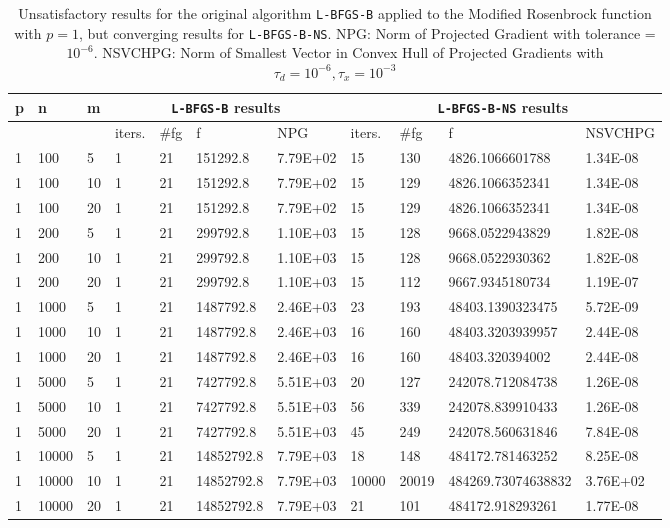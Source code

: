 \begin{table}
  \scriptsize
  \begin{center}
    \begin{tabular}{|l|l|l|l|l|l|l|l|l|l|l|}
      \hline
      p  &  n  &  m  & \multicolumn{4}{|c|}{\texttt{L-BFGS-B} results} & \multicolumn{4}{|c|}{\texttt{L-BFGS-B-NS} results} \\ \hline
      & &  & iters. & \#fg & f & NPG & iters. & \#fg & f & NSVCHPG \\ \hline
      1 & 100 & 5  & 1 & 21 & 151292.8 & 7.79E+02 & 15 & 130 & 4826.1066601788 & 1.34E-08\\
      1 & 100 & 10  & 1 & 21 & 151292.8 & 7.79E+02 & 15 & 129 & 4826.1066352341 & 1.34E-08\\
      1 & 100 & 20  & 1 & 21 & 151292.8 & 7.79E+02 & 15 & 129 & 4826.1066352341 & 1.34E-08\\
      1 & 200 & 5  & 1 & 21 & 299792.8 & 1.10E+03 & 15 & 128 & 9668.0522943829 & 1.82E-08\\
      1 & 200 & 10  & 1 & 21 & 299792.8 & 1.10E+03 & 15 & 128 & 9668.0522930362 & 1.82E-08\\
      1 & 200 & 20  & 1 & 21 & 299792.8 & 1.10E+03 & 15 & 112 & 9667.9345180734 & 1.19E-07\\
      1 & 1000 & 5  & 1 & 21 & 1487792.8 & 2.46E+03 & 23 & 193 & 48403.1390323475 & 5.72E-09\\
      1 & 1000 & 10  & 1 & 21 & 1487792.8 & 2.46E+03 & 16 & 160 & 48403.3203939957 & 2.44E-08\\
      1 & 1000 & 20  & 1 & 21 & 1487792.8 & 2.46E+03 & 16 & 160 & 48403.320394002 & 2.44E-08\\
      1 & 5000 & 5 & 1 & 21 & 7427792.8 & 5.51E+03 & 20 & 127 & 242078.712084738 & 1.26E-08\\
      1 & 5000 & 10 & 1 & 21 & 7427792.8 & 5.51E+03 & 56 & 339 & 242078.839910433 & 1.26E-08\\
      1 & 5000 & 20 & 1 & 21 & 7427792.8 & 5.51E+03 & 45 & 249 & 242078.560631846 & 7.84E-08\\
      1 & 10000 & 5 & 1 & 21 & 14852792.8 & 7.79E+03 & 18 & 148 & 484172.781463252 & 8.25E-08\\
      1 & 10000 & 10 & 1 & 21 & 14852792.8 & 7.79E+03 & 10000 & 20019 & 484269.73074638832 & 3.76E+02 \\
      1 & 10000 & 20 & 1 & 21 & 14852792.8 & 7.79E+03 & 21 & 101 & 484172.918293261 & 1.77E-08\\
      \hline
    \end{tabular}
    \caption[Modified Rosenbrock with $p = 1$]{Unsatisfactory results for the original algorithm \texttt{L-BFGS-B} applied to the Modified Rosenbrock function with $p = 1$, but converging results for \texttt{L-BFGS-B-NS}. NPG: Norm of Projected Gradient with tolerance = $10^{-6}$. NSVCHPG: Norm of Smallest Vector in Convex Hull of Projected Gradients with $\tau_d = 10^{-6}, \tau_x = 10^{-3}$}
    \label{pequal1merged}
  \end{center}
\end{table}


